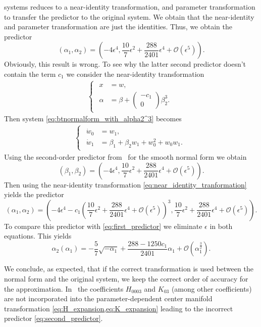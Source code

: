 systems reduces to a near-identity transformation, and parameter transformation
to transfer the predictor to the original system. We obtain that the near-identity
and parameter transformation are just the identities. Thus, we obtain the
predictor
\begin{equation}
				\label{eq:second_predictor}	
				(\alpha_1, \alpha_2) = \left(-4 \epsilon^4, \frac{10}7 \epsilon^2 
				+\frac{288}{2401}\epsilon^4 + \mathcal O(\epsilon^5) \right).
\end{equation}
Obviously, this result is wrong.  To see why the latter second predictor
doesn't contain the term $c_1$ we consider the near-identity transformation
\begin{align}
\label{eq:near_identity_tranformation}
  \begin{cases}
  \begin{aligned}
    x &{}= w, \\ 
    \alpha &{}= \beta+ \begin{pmatrix} -c_1 \\ 0 \end{pmatrix}\beta_2^3.
  \end{aligned}
  \end{cases}
\end{align}
Then system \cref{eq:btnormalform_with_alpha2^3} becomes
\begin{align*}
  \begin{cases}
  \begin{aligned}
     \dot w_0 &{}= w_1, \\
		 \dot w_1 &{}= \beta_1 + \beta_2 w_1 + w_0^2 + w_0 w_1.
  \end{aligned}
  \end{cases}
\end{align*}
Using the second-order predictor from~\cite{Al-Hdaibat2016} for the smooth
normal form we obtain
\[
    (\beta_1, \beta_2) = \left(-4 \epsilon^4, \frac{10}7 \epsilon^2 
    +\frac{288}{2401}\epsilon^4 + \mathcal O(\epsilon^5) \right).
\]
Then using the near-identity transformation
\cref{eq:near_identity_tranformation} yields the predictor
\begin{equation*}
				(\alpha_1, \alpha_2) = \left(-4 \epsilon^4 
								- c_1 \left(\frac{10}7 \epsilon^2 
								+\frac{288}{2401}\epsilon^4 + \mathcal O(\epsilon^5) \right)^3, 
								\frac{10}7 \epsilon^2 
				+\frac{288}{2401}\epsilon^4 + \mathcal O(\epsilon^5) \right).
\end{equation*}
To compare this predictor with \cref{eq:first_predictor} we eliminate $\epsilon$
in both equations. This yields
\begin{equation*}
				\alpha_2(\alpha_1) = - \frac57 \sqrt{-\alpha_1} +
				\frac{288-1250c_1}{2401} \alpha_1 + \mathcal O(\alpha_1^{\frac32}).
\end{equation*}

We conclude, as expected, that if the correct transformation is used between the
normal form and the original system, we keep the correct order of accuracy for
the approximation. In~\cite{Al-Hdaibat2016} the coefficients $H_{0003}$ and
$K_{03}$ (among other coefficients) are not incorporated into the
parameter-dependent center manifold transformation
\cref{eq:H_expansion,eq:K_expansion} leading to the incorrect
predictor \cref{eq:second_predictor}.
